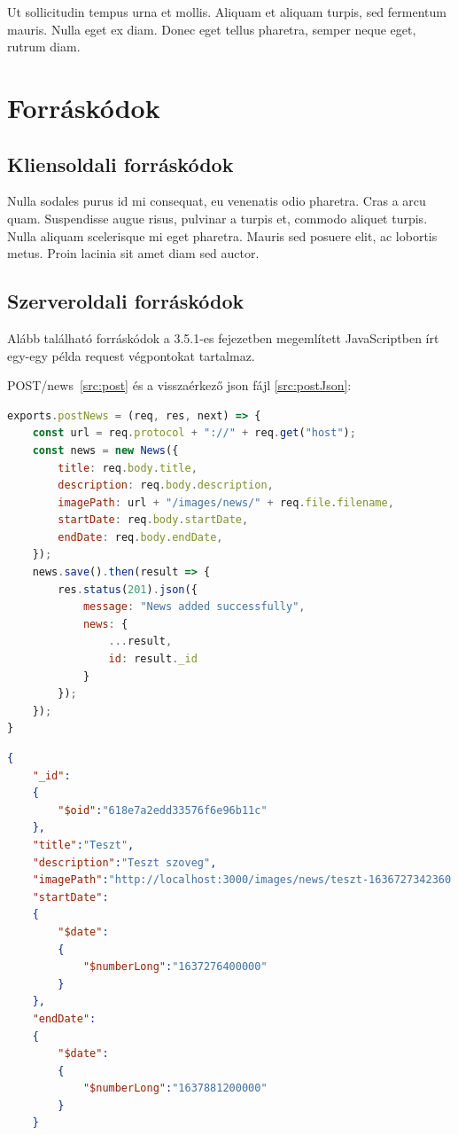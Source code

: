 Ut sollicitudin tempus urna et mollis. Aliquam et aliquam turpis, sed fermentum mauris. Nulla eget ex diam. Donec eget tellus pharetra, semper neque eget, rutrum diam.


\section{Forráskódok} %

\subsection{Kliensoldali forráskódok}
Nulla sodales purus id mi consequat, eu venenatis odio pharetra. Cras a arcu quam. Suspendisse augue risus, pulvinar a turpis et, commodo aliquet turpis. Nulla aliquam scelerisque mi eget pharetra. Mauris sed posuere elit, ac lobortis metus. Proin lacinia sit amet diam sed auctor.

\subsection{Szerveroldali forráskódok}
Alább található forráskódok a 3.5.1-es fejezetben megemlített JavaScriptben írt egy-egy példa request végpontokat tartalmaz.

POST/news~\ref{src:post} és a visszaérkező json fájl \ref{src:postJson}:

\begin{lstlisting}[language=JavaScript]
exports.postNews = (req, res, next) => {
	const url = req.protocol + "://" + req.get("host");
	const news = new News({
		title: req.body.title,
		description: req.body.description,
		imagePath: url + "/images/news/" + req.file.filename,
		startDate: req.body.startDate,
		endDate: req.body.endDate,
	});
	news.save().then(result => {
		res.status(201).json({
			message: "News added successfully",
			news: {
				...result,
				id: result._id
			}
		});
	});
}
\end{lstlisting}

\begin{lstlisting}[language={JSON}]
{
	"_id":
	{
		"$oid":"618e7a2edd33576f6e96b11c"
	},
	"title":"Teszt",
	"description":"Teszt szoveg",
	"imagePath":"http://localhost:3000/images/news/teszt-1636727342360.jpg",
	"startDate":
	{
		"$date":
		{
			"$numberLong":"1637276400000"
		}
	},
	"endDate":
	{
		"$date":
		{
			"$numberLong":"1637881200000"
		}
	}
\end{lstlisting}

